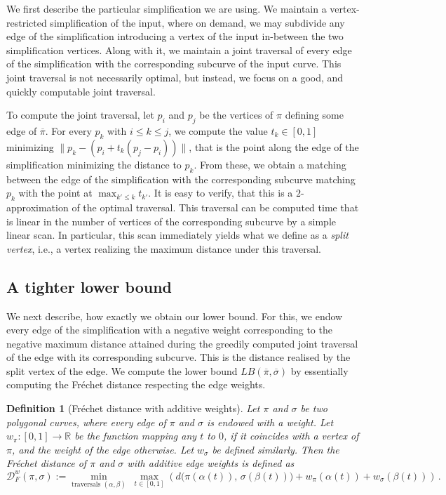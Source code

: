 \documentclass[10pt,a4paper]{article}
\newtheorem{definition}[theorem]{Definition}
\newcommand{\fd}{\mathcal{D}_F}
\begin{document}
We first describe the particular simplification we are using. We maintain a vertex-restricted simplification of the input, where on demand, we may subdivide any edge of the simplification introducing a vertex of the input in-between the two simplification vertices. Along with it, we maintain a joint traversal of every edge of the simplification with the corresponding subcurve of the input curve. This joint traversal is not necessarily optimal, but instead, we focus on a good, and quickly computable joint traversal. 

To compute the joint traversal, let $p_i$ and $p_j$ be the vertices of $\pi$ defining some edge of $\overline{\pi}$. For every $p_k$ with $i\leq k\leq j$, we compute the value $t_k\in[0,1]$ minimizing $\|p_k-(p_i+t_k(p_j-p_i))\|$, that is the point along the edge of the simplification minimizing the distance to $p_k$. From these, we obtain a matching between the edge of the simplification with the corresponding subcurve matching $p_k$ with the point at $\max_{k'\leq k}t_{k'}$. It is easy to verify, that this is a $2$-approximation of the optimal traversal. 
This traversal can be computed time that is linear in the number of vertices of the corresponding subcurve by a simple linear scan. In particular, this scan immediately yields what we define as a \emph{split vertex}, i.e., a vertex realizing the maximum distance under this traversal.

\subsection{A tighter lower bound}

We next describe, how exactly we obtain our lower bound. For this, we endow every edge of the simplification with a negative weight corresponding to the negative maximum distance attained during the greedily computed joint traversal of the edge with its corresponding subcurve. This is the distance realised by the split vertex of the edge.  We compute the lower bound $LB(\overline{\pi},\overline{\sigma})$ by essentially computing the Fréchet distance respecting the edge weights. 

\begin{definition}[Fréchet distance with additive weights]
    Let $\pi$ and $\sigma$ be two polygonal curves, where every edge of $\pi$ and $\sigma$ is endowed with a weight. Let $w_\pi:[0,1]\rightarrow\mathbb{R}$ be the function mapping any $t$ to $0$, if it coincides with a vertex of $\pi$, and the weight of the edge otherwise. Let $w_\sigma$ be defined similarly. Then the Fréchet distance of $\pi$ and $\sigma$ with additive edge weights is defined as
    \[\fd^w(\pi,\sigma):= \min\limits_{\text{traversals } (\alpha,\beta)}\;
           \max\limits_{t \in [0,1]}\left( d\bigl( \pi(\alpha(t)),\, \sigma(\beta(t)) \bigr) + w_\pi(\alpha(t)) + w_\sigma(\beta(t))\right)\, .\]
\end{definition}
\end{document}

